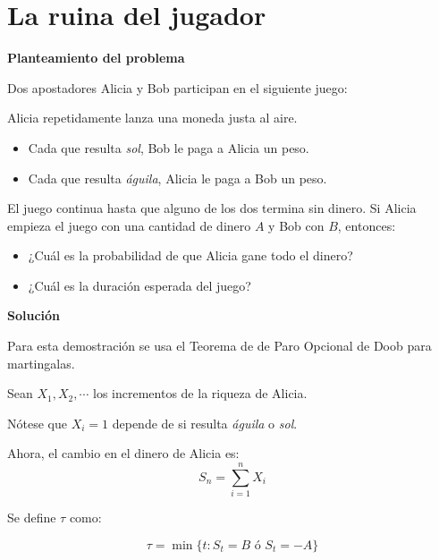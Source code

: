 \chapter{La ruina del jugador}\label{chap:ruina}


\textbf{Planteamiento del problema}
 
Dos apostadores Alicia y Bob participan en el siguiente juego:

Alicia repetidamente lanza una moneda justa al aire. 
\begin{itemize}

	\item Cada que resulta \emph{sol}, Bob le paga a Alicia un peso.

	\item Cada que resulta \emph{águila}, Alicia le paga a Bob un peso.

\end{itemize}

El juego continua hasta que alguno de los dos termina sin dinero.
Si Alicia empieza el juego con una cantidad de dinero $A$ y Bob con $B$, entonces:
\begin{itemize}

	\item ¿Cuál es la probabilidad de que Alicia gane todo el dinero?

	\item ¿Cuál es la duración esperada del juego?

\end{itemize}

\textbf{Solución}

Para esta demostración se usa el Teorema de de Paro Opcional de Doob para martingalas.

Sean $X_1,X_2,\cdots$ los incrementos de la riqueza de Alicia. 

Nótese que $X_i= 1$ depende de si resulta \emph{águila} o \emph{sol}.

Ahora, el cambio en el dinero de Alicia es:
\[S_n = \sum_{i=1}^n X_i\]

Se define $\tau$ como:

\[\tau = \min\{t: S_t = B \mbox{ ó } S_t = -A \}\]


